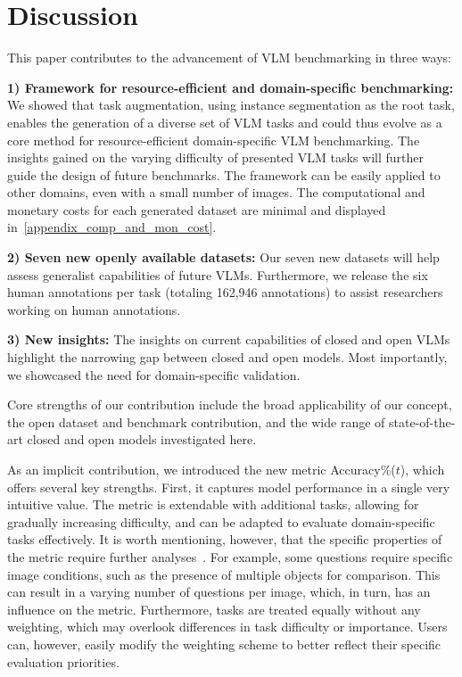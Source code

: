 


\section{Discussion}

This paper contributes to the advancement of VLM benchmarking in three ways: 

\textbf{1) Framework for resource-efficient and domain-specific benchmarking:} We showed that task augmentation, using instance segmentation as the root task, enables the generation of a diverse set of VLM tasks and could thus evolve as a core method for resource-efficient domain-specific VLM benchmarking. The insights gained on the varying difficulty of presented VLM tasks will further guide the design of future benchmarks. The framework can be easily applied to other domains, even with a small number of images. The computational and monetary costs for each generated dataset are minimal and displayed in~\cref{appendix_comp_and_mon_cost}. 

\textbf{2) Seven new openly available datasets:} Our seven new datasets will help assess generalist capabilities of future VLMs. Furthermore, we release the six human annotations per task (totaling 162,946 annotations) to assist researchers working on human annotations. 

\textbf{3) New insights:} The insights on current capabilities of closed and open VLMs highlight the narrowing gap between closed and open models. Most importantly, we showcased the need for domain-specific validation.

Core strengths of our contribution include the broad applicability of our concept, the open dataset and benchmark contribution, and the wide range of state-of-the-art closed and open models investigated here.

As an implicit contribution, we introduced the new metric Accuracy\%($t$), which offers several key strengths. First, it captures model performance in a single very intuitive value. The metric is extendable with additional tasks, allowing for gradually increasing difficulty, and can be adapted to evaluate domain-specific tasks effectively. It is worth mentioning, however, that the specific properties of the metric require further analyses~\cite{reinke2024understanding}. For example, some questions require specific image conditions, such as the presence of multiple objects for comparison. This can result in a varying number of questions per image, which, in turn, has an influence on the metric. Furthermore, tasks are treated equally without any weighting, which may overlook differences in task difficulty or importance. Users can, however, easily modify the weighting scheme to better reflect their specific evaluation priorities.

